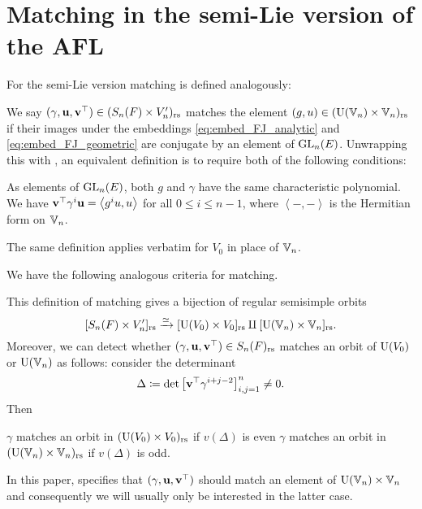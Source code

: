 \section{Matching in the semi-Lie version of the AFL}
For the semi-Lie version matching is defined analogously:
\begin{definition}
  We say $(\gamma, \mathbf u, \mathbf v^\top) \in (S_n(F) \times V_n')_{\mathrm{rs}}$
  matches the element $(g, u) \in (\operatorname{U}(\mathbb V_n) \times \mathbb V_n)_{\mathrm{rs}}$ if
  their images under the embeddings \eqref{eq:embed_FJ_analytic}
  and \eqref{eq:embed_FJ_geometric} are conjugate by an element of $\operatorname{GL}_n(E)$.
  Unwrapping this with ,
  an equivalent definition is to require both of the following conditions:
  \begin{itemize}
    \ii As elements of $\operatorname{GL}_n(E)$,
    both $g$ and $\gamma$ have the same characteristic polynomial.
    \ii We have $\mathbf v^\top \gamma^i \mathbf u = \left< g^i u, u \right>$ for all $0 \le i \le n-1$,
    where $\left< -,- \right>$ is the Hermitian form on $\mathbb V_n$.
  \end{itemize}
  The same definition applies verbatim for $V_0$ in place of $\mathbb V_n$.
  \label{def:matching_semi_lie}
\end{definition}
We have the following analogous criteria for matching.
\begin{proposition}
  \label{prop:valuation_delta_matching_semilie}
  This definition of matching gives
  a bijection of regular semisimple orbits
  \[ [S_n(F) \times V_n']_{\mathrm{rs}} \xrightarrow{\simeq} [\operatorname{U}(V_0) \times V_0]_{\mathrm{rs}} \amalg [\operatorname{U}(\mathbb V_n) \times \mathbb V_n]_{\mathrm{rs}}. \]
  Moreover, we can detect whether ${(\gamma, \mathbf u, \mathbf v^\top)} \in S_n(F)_{\mathrm{rs}}$ matches an orbit of
  $\operatorname{U}(V_0)$ or $\operatorname{U}(\mathbb V_n)$ as follows: consider the determinant
  \[ \Delta \coloneqq \det \left[ \mathbf v^\top \gamma^{i+j-2} \right]_{i,j=1}^n \neq 0. \]
  Then
  \begin{itemize}
    \ii $\gamma$ matches an orbit in $(\operatorname{U}(V_0) \times V_0)_{\mathrm{rs}}$ if $v(\Delta)$ is even
    \ii $\gamma$ matches an orbit in $(\operatorname{U}(\mathbb V_n) \times \mathbb V_n)_{\mathrm{rs}}$ if $v(\Delta)$ is odd.
  \end{itemize}
\end{proposition}
In this paper, 
specifies that ${(\gamma, \mathbf u, \mathbf v^\top)}$ should match an element of $\operatorname{U}(\mathbb V_n) \times \mathbb V_n$
and consequently we will usually only be interested in the latter case.
